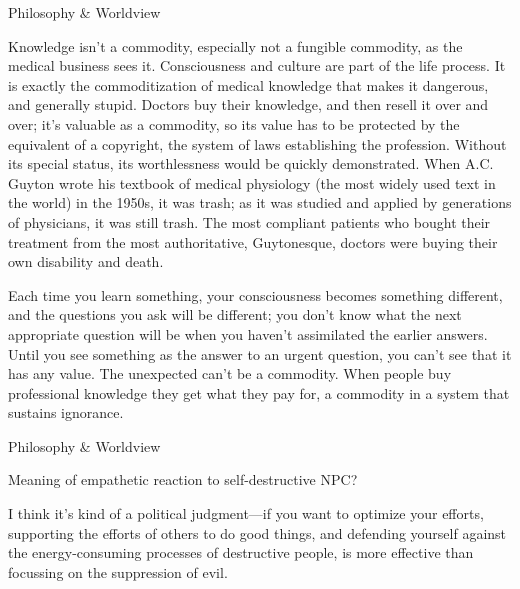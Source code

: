\documentclass[11pt,oneside,openany,extrafontsizes]{memoir}
\begin{document}
\begin{standalonequote}{Philosophy \& Worldview}

    \begin{answer}
      Knowledge isn't a commodity, especially not a fungible commodity, as the medical business sees it. Consciousness and culture are part of the life process. It is exactly the commoditization of medical knowledge that makes it dangerous, and generally stupid. Doctors buy their knowledge, and then resell it over and over; it's valuable as a commodity, so its value has to be protected by the equivalent of a copyright, the system of laws establishing the profession. Without its special status, its worthlessness would be quickly demonstrated. When A.C. Guyton wrote his textbook of medical physiology (the most widely used text in the world) in the 1950s, it was trash; as it was studied and applied by generations of physicians, it was still trash. The most compliant patients who bought their treatment from the most authoritative, Guytonesque, doctors were buying their own disability and death. 
	  
	  Each time you learn something, your consciousness becomes something different, and the questions you ask will be different; you don't know what the next appropriate question will be when you haven't assimilated the earlier answers. Until you see something as the answer to an urgent question, you can't see that it has any value. The unexpected can't be a commodity. When people buy professional knowledge they get what they pay for, a commodity in a system that sustains ignorance.

    \end{answer}
\end{standalonequote}

\begin{qaexchange}{Philosophy \& Worldview}

    \begin{question}
        Meaning of empathetic reaction to self-destructive NPC?
    \end{question}

    \begin{answer}
      I think it's kind of a political judgment—if you want to optimize your efforts, supporting the efforts of others to do good things, and defending yourself against the energy-consuming processes of destructive people, is more effective than focussing on the suppression of evil.
    \end{answer}
\end{qaexchange}
\end{document}
